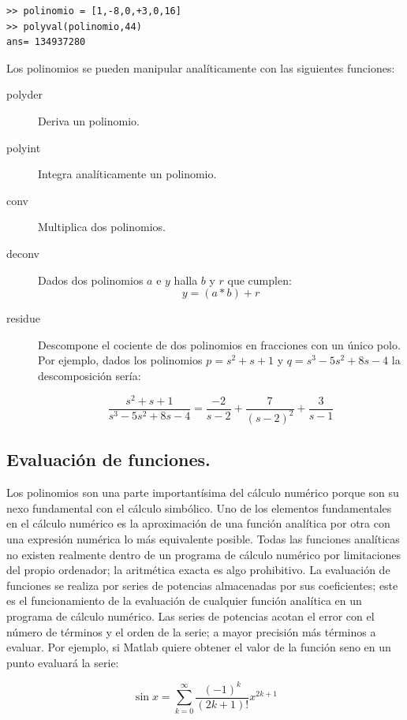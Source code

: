 \begin{verbatim}
>> polinomio = [1,-8,0,+3,0,16]
>> polyval(polinomio,44)
ans= 134937280
\end{verbatim}
Los polinomios se pueden manipular analíticamente con las siguientes
funciones:

\begin{description}
\item [polyder\texttt{}]Deriva un polinomio.
\item [polyint\texttt{}]Integra analíticamente un
  polinomio.
\item [conv]Multiplica dos polinomios.
\item [deconv]Dados dos polinomios $a$ e $y$ halla $b$ y
  $r$ que cumplen:\[ y=(a*b)+r\]

\item [residue]Descompone el cociente de dos polinomios
  en fracciones con un único polo. Por ejemplo, dados los polinomios
  $p=s^{2}+s+1$ y $q=s^{3}-5s^{2}+8s-4$ la descomposición sería:

$$\frac{s^{2}+s+1}{s^{3}-5s^{2}+8s-4}=
\frac{-2}{s-2}+\frac{7}{(s-2)^{2}}+\frac{3}{s-1}$$

\end{description}

\subsection{Evaluación de
  funciones.\label{sub:Evaluaci=F3n-de-funciones.}}

Los polinomios son una parte importantísima del cálculo numérico
porque son su nexo fundamental con el cálculo simbólico. Uno de los
elementos fundamentales en el cálculo numérico es la aproximación de
una función analítica por otra con una expresión numérica lo más
equivalente posible.  Todas las funciones analíticas no existen
realmente dentro de un programa de cálculo numérico por limitaciones
del propio ordenador; la aritmética exacta es algo prohibitivo. La
evaluación de funciones se realiza por series de potencias almacenadas
por sus coeficientes; este es el funcionamiento de la evaluación de
cualquier función analítica en un programa de cálculo numérico. Las
series de potencias acotan el error con el número de términos y el
orden de la serie; a mayor precisión más términos a evaluar. Por
ejemplo, si Matlab quiere obtener el valor de la función seno en un
punto evaluará la serie:

$$\sin x=\sum_{k=0}^{\infty}\frac{(-1)^{k}}{(2k+1)!}x^{2k+1}$$


